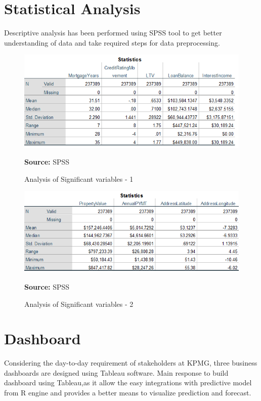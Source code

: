 \section{Statistical Analysis}

Descriptive analysis has been performed using SPSS tool to get better understanding of data and take required steps for data preprocessing.

\begin{center}
\begin{figure}[!htb]
\includegraphics[scale=0.7]{stats1.png}
\centering
\caption{Analysis of Significant variables - 1}{\textbf{Source:} SPSS}
\label{fig:stats1}
\end{figure}
\end{center}


\begin{center}
\begin{figure}[!htb]
\includegraphics[scale=0.7]{stats2.png}
\centering
\caption{Analysis of Significant variables - 2}{\textbf{Source:} SPSS}
\label{fig:stats2}
\end{figure}
\end{center}



\section{Dashboard}
Considering the day-to-day requirement of stakeholders at KPMG, three business dashboards are designed using Tableau software. Main response to build dashboard using Tableau,as it allow the easy integrations with predictive model from R engine and provides a better means to visualize prediction and forecast.

